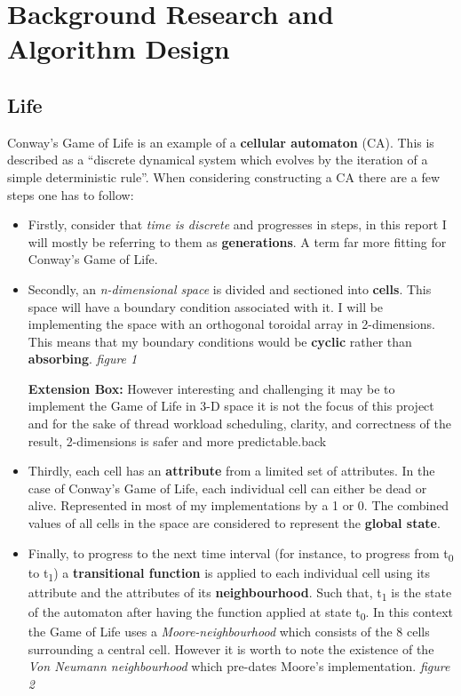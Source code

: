 \documentclass[11pt]{article} %
\begin{document}
\section{Background Research and Algorithm Design}
\subsection{Life}
Conway's Game of Life is an example of a {\bf cellular automaton} (CA). This is described \cite[p6]{ref6} as a ``discrete dynamical system which evolves by the iteration of a simple deterministic rule''. When considering constructing a CA there are a few steps one has to follow:
\begin{itemize}
\item Firstly, consider that \emph{time is discrete} and progresses in steps, in this report I will mostly be referring to them as {\bf generations}. A term far more fitting for Conway's Game of Life. 
\item Secondly, an \emph{n-dimensional space} is divided and sectioned into {\bf cells}. This space will have a boundary condition associated with it. I will be implementing the space with an orthogonal toroidal array in 2-dimensions. This means that my boundary conditions would be {\bf cyclic} rather than {\bf absorbing}. {\it figure 1}
\begin{mdframed}
{\bf Extension Box:} However interesting and challenging it may be to implement the Game of Life in 3-D space it is not the focus of this project and for the sake of thread workload scheduling, clarity, and correctness of the result, 2-dimensions is safer and more predictable.back
\end{mdframed}
\item Thirdly, each cell has an {\bf attribute} from a limited set of attributes. In the case of Conway's Game of Life, each individual cell can either be dead or alive. Represented in most of my implementations by a 1 or 0. The combined values of all cells in the space are considered to represent the {\bf global state}.
\item Finally, to progress to the next time interval (for instance, to progress from t\textsubscript{0} to t\textsubscript{1}) a {\bf transitional function} is applied to each individual cell using its attribute and the attributes of its {\bf neighbourhood}. Such that, t\textsubscript{1} is the state of the automaton after having the function applied at state t\textsubscript{0}. In this context the Game of Life uses a \emph{Moore-neighbourhood} which consists of the 8 cells surrounding a central cell. However it is worth to note the existence of the \emph{Von Neumann neighbourhood} which pre-dates Moore's implementation. {\it figure 2}
\end{itemize}
\end{document}
